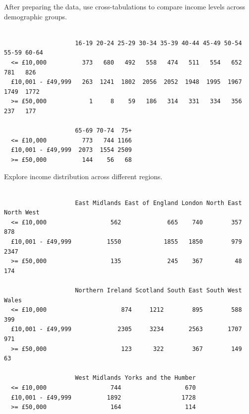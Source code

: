 \documentclass[
  letterpaper,
  DIV=11,
  numbers=noendperiod]{scrreprt}
\newenvironment{Shaded}{\begin{snugshade}}{\end{snugshade}}
\newcommand{\CommentTok}[1]{\textcolor[rgb]{0.37,0.37,0.37}{#1}}
\newcommand{\FunctionTok}[1]{\textcolor[rgb]{0.28,0.35,0.67}{#1}}
\newcommand{\NormalTok}[1]{\textcolor[rgb]{0.00,0.23,0.31}{#1}}
\newcommand{\SpecialCharTok}[1]{\textcolor[rgb]{0.37,0.37,0.37}{#1}}
\begin{document}
After preparing the data, use cross-tabulations to compare income levels
across demographic groups.

\begin{Shaded}
\end{Shaded}

\begin{verbatim}
                   
                    16-19 20-24 25-29 30-34 35-39 40-44 45-49 50-54 55-59 60-64
  <= £10,000          373   680   492   558   474   511   554   652   781   826
  £10,001 - £49,999   263  1241  1802  2056  2052  1948  1995  1967  1749  1772
  >= £50,000            1     8    59   186   314   331   334   356   237   177
                   
                    65-69 70-74  75+
  <= £10,000          773   744 1166
  £10,001 - £49,999  2073  1554 2509
  >= £50,000          144    56   68
\end{verbatim}

Explore income distribution across different regions.

\begin{Shaded}
\end{Shaded}

\begin{verbatim}
                   
                    East Midlands East of England London North East North West
  <= £10,000                  562             665    740        357        878
  £10,001 - £49,999          1550            1855   1850        979       2347
  >= £50,000                  135             245    367         48        174
                   
                    Northern Ireland Scotland South East South West Wales
  <= £10,000                     874     1212        895        588   399
  £10,001 - £49,999             2305     3234       2563       1707   971
  >= £50,000                     123      322        367        149    63
                   
                    West Midlands Yorks and the Humber
  <= £10,000                  744                  670
  £10,001 - £49,999          1892                 1728
  >= £50,000                  164                  114
\end{verbatim}
\end{document}
